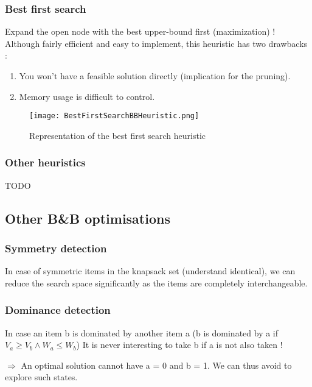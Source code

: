 \subsubsection{Best first search}

Expand the open node with the best upper-bound first (maximization) !
Although fairly efficient and easy to implement, this heuristic has two drawbacks :

\begin{enumerate}
	\item You won't have a feasible solution directly (implication for the pruning).
	\item Memory usage is difficult to control.
\end{enumerate}

\begin{figure}[!ht]
    \centering
    \texttt{[image: BestFirstSearchBBHeuristic.png]}
    \caption{Representation of the best first search heuristic}
    \label{fig:Knapsack_example}
\end{figure}
\FloatBarrier

\subsubsection{Other heuristics}

TODO

\subsection{Other B\&B optimisations}

\subsubsection{Symmetry detection}

In case of symmetric items in the knapsack set (understand identical), we can reduce the
search space significantly as the items are completely interchangeable.

\subsubsection{Dominance detection}

In case an item b is dominated by another item a
(b is dominated by a if $V_a \geq V_b \wedge W_a \leq W_b$)
It is never interesting to take b if a is not also taken ! 

$\Rightarrow$ An optimal solution cannot have a = 0 and b = 1. 
We can thus avoid to explore such states.

